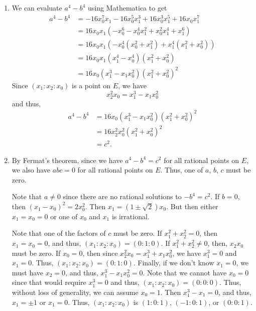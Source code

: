 \documentclass[12 pt, letterpaper]{hmcpset}
\begin{document}
\begin{solution}
	\begin{enumerate}
		\item We can evaluate $a^{4} - b^{4}$ using Mathematica to get
			\[
				\begin{split}
					a^{4} - b^{4} & = -16 x_{0}^{7} x_{1} - 16 x_{0}^{5} x_{1}^{3} + 16 x_{0}^{3} x_{1}^{5} + 16 x_{0} x_{1}^{7} \\
						      & = 16 x_{0} x_{1} (-x_{0}^{6} - x_{0}^{4} x_{1}^{2} + x_{0}^{2} x_{1}^{4} + x_{1}^{6}) \\
						      & = 16 x_{0} x_{1} (-x_{0}^{4}(x_{0}^{2} + x_{1}^{2}) + x_{1}^{4}(x_{1}^{2} + x_{0}^{2})) \\
						      & = 16 x_{0} x_{1} (x_{1}^{4} - x_{0}^4) (x_{1}^{2} + x_{0}^{2}) \\
						      & = 16 x_{0} (x_{1}^{3} - x_{1} x_{0}^{2})(x_{1}^{2} + x_{0}^{2})^{2}
				\end{split}
			\]
			Since $(x_{1} : x_{2} : x_{0})$ is a point on $E$, we have
			\[
				x_{2}^{2} x_{0} = x_{1}^{3} - x_{1} x_{0}^{2}
			\]
			and thus,
			\[
				\begin{split}
					a^{4} - b^{4} & = 16 x_{0} (x_{1}^{3} - x_{1} x_{0}^{2})(x_{1}^{2} + x_{0}^{2})^{2} \\
						      & = 16 x_{2}^{2} x_{0}^{2} (x_{1}^{2} + x_{0}^{2})^{2} \\
						      & = c^{2}.
				\end{split}
			\]
		\item By Fermat's theorem, since we have $a^{4} - b^{4} = c^{2}$ for all rational points on $E$, we also have $abc = 0$ for all rational points on $E$. Thus, one of $a$, $b$, $c$ must be zero.

			Note that $a \neq 0$ since there are no rational solutions to $- b^{4} = c^{2}$. If $b = 0$, then $(x_{1} - x_{0})^{2} = 2 x_{0}^{2}$. Then  $x_{1} = (1 \pm \sqrt{2}) x_{0}$. But then either $x_{1} = x_{0} = 0$ or one of $x_{0}$ and $x_{1}$ is irrational.

			Note that one of the factors of $c$ must be zero. If $x_{1}^{2} + x_{2}^{2} = 0$, then $x_{1} = x_{0} = 0$, and thus, $(x_{1} : x_{2} : x_{0}) = (0 : 1 : 0)$. If $x_{1}^{2} + x_{2}^{2} \neq 0$, then, $x_{2} x_{0}$ must be zero. If $x_{0} = 0$, then since $x_{2}^{2} x_{0} = x_{1}^{3} + x_{1} x_{0}^{2}$, we have $x_{1}^{3} = 0$ and $x_{1} = 0$. Thus, $(x_{1} : x_{2} : x_{0}) = (0 : 1 : 0)$. Finally, if we don't know $x_{1} = 0$, we must have $x_{2} = 0$, and thus, $x_{1}^{3} - x_{1} x_{0}^{2} = 0$. Note that we cannot have $x_{0} = 0$ since that would require $x_{1}^{3} = 0$ and thus, $(x_{1} : x_{2} : x_{0}) = (0 : 0 : 0)$. Thus, without loss of generality, we can assume $x_{0} = 1$. Then $x_{1}^{3} - x_{1} = 0$, and thus, $x_{1} = \pm 1$ or $x_{1} = 0$. Thus, $(x_{1} : x_{2} : x_{0})$ is $(1 : 0 : 1)$, $(-1 : 0 : 1)$, or $(0 : 0 : 1)$.


\end{enumerate}
\end{solution}
\end{document}
